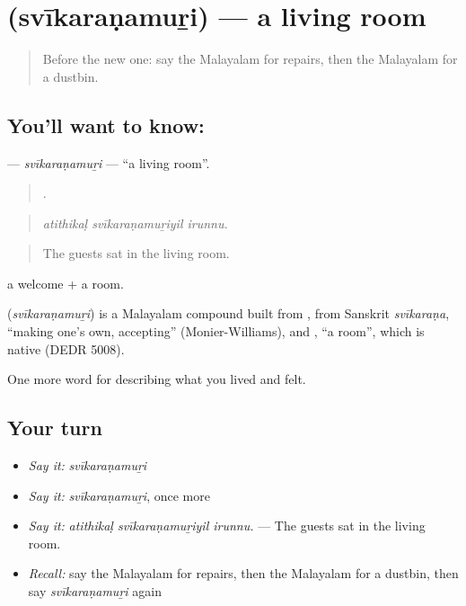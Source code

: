 \section[\texorpdfstring{\ml{സ്വീകരണമുറി} (svīkaraṇamuṟi)}{സ്വീകരണമുറി (svīkaraṇamuṟi)}]{ (svīkaraṇamuṟi) — a living room}

\label{lesson:ML-C571-svikaranamuri}



\begin{quote}
Before the new one: say the Malayalam for repairs, then the Malayalam for a dustbin.
\end{quote}

\subsection*{You'll want to know: }
\textbf{} — \emph{svīkaraṇamuṟi} — \textquotedblleft{}a living room\textquotedblright{}.

\begin{quote}
  .
\end{quote}

\begin{quote}
\emph{atithikaḷ svīkaraṇamuṟiyil irunnu.}
\end{quote}

\begin{quote}
The guests sat in the living room.
\end{quote}

 a welcome +  a room.

\begin{cousinweb}
\textbf{} (\emph{svīkaraṇamuṟi}) is a Malayalam compound built from , from Sanskrit \emph{svīkaraṇa}, \textquotedblleft{}making one's own, accepting\textquotedblright{} (Monier-Williams), and , \textquotedblleft{}a room\textquotedblright{}, which is native (DEDR 5008).
\end{cousinweb}

\begin{grammarlens}[title={What you've built}]
One more word for describing what you lived and felt.
\end{grammarlens}

\subsection*{Your turn}
\begin{itemize}
\raggedright
  \item \emph{Say it:} \emph{svīkaraṇamuṟi}
  \item \emph{Say it:} \emph{svīkaraṇamuṟi}, once more
  \item \emph{Say it:} \emph{atithikaḷ svīkaraṇamuṟiyil irunnu.} — The guests sat in the living room.
  \item \emph{Recall:} say the Malayalam for repairs, then the Malayalam for a dustbin, then say \emph{svīkaraṇamuṟi} again
\end{itemize}

